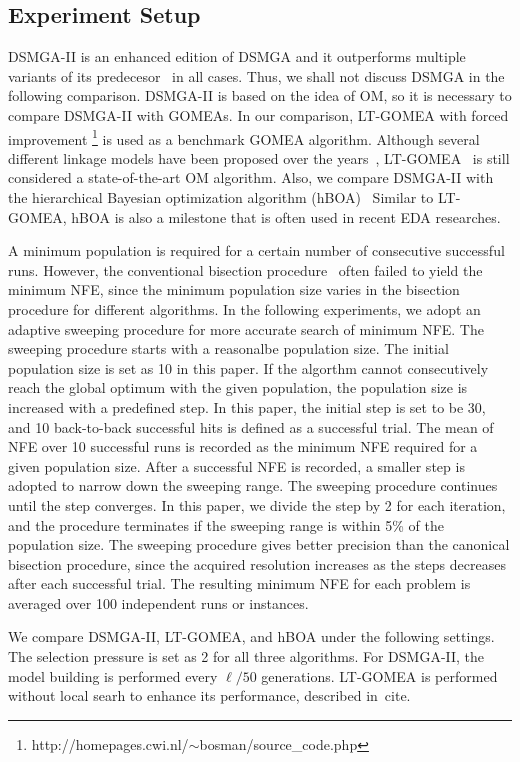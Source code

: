 \documentclass{sig-alternate-05-2015}
\begin{document}
\subsection{Experiment Setup}
DSMGA-II is an enhanced edition of DSMGA and it outperforms multiple variants of its predecesor~\cite{yu:DSMGA} in all cases. 
Thus, we shall not discuss DSMGA in the following comparison.
DSMGA-II is based on the idea of OM, so it is necessary to compare DSMGA-II with GOMEAs. 
In our comparison, LT-GOMEA with forced improvement \footnote{http://homepages.cwi.nl/$\sim$bosman/source\_code.php} is used as a benchmark GOMEA algorithm.
Although several different linkage models have been proposed over the years~\cite{bosman:robust}, LT-GOMEA~\cite{bosman:LT-GOMEA} is still considered a state-of-the-art OM algorithm.
Also, we compare DSMGA-II with the hierarchical Bayesian optimization algorithm (hBOA)~\cite{pelikan:hBOA}
Similar to LT-GOMEA, hBOA is also a milestone that is often used in recent EDA researches.


A minimum population is required for a certain number of consecutive successful runs.
However, the conventional bisection procedure~\cite{pelikan:hBOA} often failed to yield the minimum NFE, since the minimum population size varies in the bisection procedure for different algorithms.
In the following experiments, we adopt an adaptive sweeping procedure for more accurate search of minimum NFE.
The sweeping procedure starts with a reasonalbe population size.
The initial population size is set as 10 in this paper.
If the algorthm cannot consecutively reach the global optimum with the given population, the population size is increased with a predefined step.
In this paper, the initial step is set to be 30, and 10 back-to-back successful hits is defined as a successful trial.
The mean of NFE over 10 successful runs is recorded as the minimum NFE required for a given population size.
After a successful NFE is recorded, a smaller step is adopted to narrow down the sweeping range.
The sweeping procedure continues until the step converges.
In this paper, we divide the step by 2 for each iteration, and the procedure terminates if the sweeping range is within 5\% of the population size.
The sweeping procedure gives better precision than the canonical bisection procedure, since the acquired resolution increases as the steps decreases after each successful trial.
The resulting minimum NFE for each problem is averaged over 100 independent runs or instances.

We compare DSMGA-II, LT-GOMEA, and hBOA under the following settings. The selection pressure is set as 2 for all three algorithms. 
For DSMGA-II, the model building is performed every $\ell/50$ generations.
LT-GOMEA is performed without local searh to enhance its performance, described in~cite{}.
\end{document}
